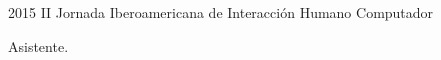 \documentclass[]{cv-class}
\begin{document}
\begin{entrylist}
{    {\href{https://bit.ly/36BxP2W}{}}
	}
	
	\entry
	{2015}
	{II Jornada Iberoamericana de Interacción Humano Computador}
	{}
	{Asistente.
    
    {\href{https://bit.ly/2UiQBGx}{}}
	}
\end{entrylist}
\end{document}

